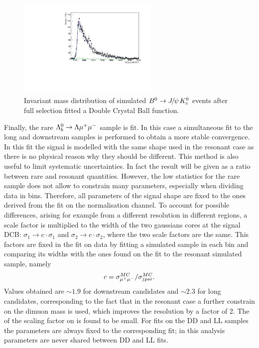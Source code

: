 \begin{figure}
\centering
\includegraphics[width=0.6\textwidth]{Lmumu/figs/MassFits/fitKS_bkg.pdf}
\caption{Invariant mass distribution of simulated $\Bz\ra\jpsi\KS$ events after 
full selection fitted a Double Crystal Ball function. }
\label{fig:KSbkgFit}
\end{figure}

Finally, the rare $\Lambda^0_b\rightarrow\Lambda\mu^+\mu^-$ sample is fit. In this case a simultaneous fit to the long
and downstream samples is performed to obtain a more stable convergence. 
In this fit the signal is modelled with the same shape used in the resonant case as there is no physical
reason why they should be different. This method is also useful to limit systematic uncertainties.
In fact the result will be given as a ratio between rare and resonant quantities.
However, the low statistics for the rare sample does not allow to constrain many parameters,
especially when dividing data in \qsq bins. Therefore, all parameters of the signal shape are fixed to
the ones derived from the fit on the normalisation channel. To account for possible differences, arising
for example from a different resolution in different \qsq regions, a scale factor is multiplied
to the width of the two gaussians cores at the signal DCB: $\sigma_1 \rightarrow c\cdot \sigma_1$
and $\sigma_2 \rightarrow c\cdot \sigma_2$, where the two scale factors are the same. This factors
are fixed in the fit on data by fitting a \Lz\mumu simulated sample in each \qsq bin and comparing
its widths with the ones found on the fit to the resonant simulated sample, namely
\begin{equation}
c = \sigma_{\mu^+\mu^-}^{MC} / \sigma_{jpsi}^{MC}.
\end{equation}
Values obtained are $\sim 1.9$ for downstream candidates and $\sim 2.3$ for long candidates,
corresponding to the fact that in the resonant case a further constrain on the dimuon mass
is used, which improves the resolution by a factor of 2. The of the scaling factor on \qsq is found to be small.
For fits on the DD and LL samples the parameters are always fixed to the corresponding \jpsi fit;
in this analysis parameters are never shared between DD and LL fits.


